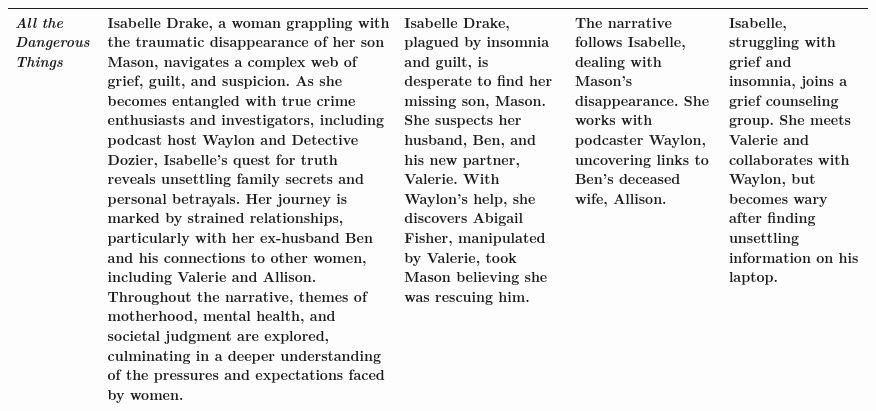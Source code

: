 \begin{longtable}{|p{1cm}|p{3cm}|p{3cm}|p{3cm}|p{3cm}|}
    \textit{All the Dangerous Things} & {\color{character}Isabelle Drake}, a woman grappling with the {\color{event}traumatic disappearance of her son Mason}, navigates a complex web of grief, guilt, and suspicion. As she becomes entangled with true crime enthusiasts and investigators, including {\color{character}podcast host Waylon} and {\color{character}Detective Dozier}, Isabelle's quest for truth reveals unsettling family secrets and personal betrayals. Her journey is marked by strained relationships, particularly with her ex-husband {\color{character}Ben} and his connections to other women, including {\color{character}Valerie} and {\color{character}Allison}. Throughout the narrative, themes of {\color{theme}motherhood, mental health, and societal judgment} are explored, culminating in a deeper understanding of the pressures and expectations faced by women. & {\color{character}Isabelle Drake}, plagued by {\color{theme}insomnia and guilt}, is desperate to find her missing son, {\color{character}Mason}. She suspects her husband, {\color{character}Ben}, and his new partner, {\color{character}Valerie}. With {\color{character}Waylon's} help, she discovers {\color{character}Abigail Fisher}, manipulated by {\color{character}Valerie}, took Mason believing she was rescuing him. & The narrative follows {\color{character}Isabelle}, dealing with {\color{event}Mason's disappearance}. She works with podcaster {\color{character}Waylon}, uncovering links to {\color{character}Ben's} deceased wife, {\color{character}Allison}. & {\color{character}Isabelle}, struggling with {\color{theme}grief and insomnia}, joins a {\color{location}grief counseling group}. She meets {\color{character}Valerie} and collaborates with {\color{character}Waylon}, but becomes wary after finding unsettling information on his laptop. \\
    \hline

\end{longtable}
